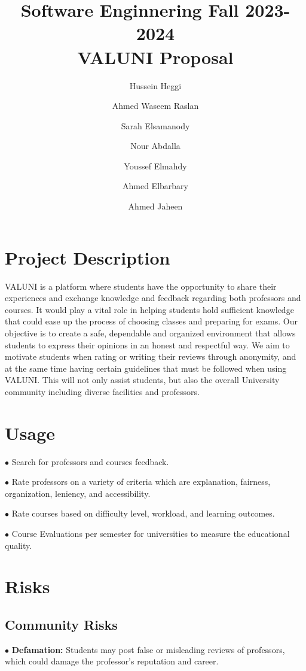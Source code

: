 \documentclass{article}
\title{Software Enginnering Fall 2023-2024 \\ VALUNI Proposal}
\author{  
Hussein Heggi 	\and
Ahmed Waseem Raslan 	\and
Sarah Elsamanody 	\and
Nour Abdalla 	\and
Youssef Elmahdy	\and
Ahmed Elbarbary	\and 
Ahmed Jaheen}
\begin{document}
\begin{titlingpage}
\maketitle
\end{titlingpage}

\break

\tableofcontents

\break

\section{Project Description}
\quad VALUNI is a platform where students have the opportunity to share their experiences and exchange knowledge and feedback regarding both professors and courses.  It would play a vital role in helping students hold sufficient knowledge that could ease up the process of choosing classes and preparing for exams. Our objective is to create a safe, dependable and organized environment that allows students to express their opinions in an honest and respectful way. We aim to motivate students when rating or writing their reviews through anonymity, and at the same time having certain guidelines that must be followed when using VALUNI. This will not only assist students, but also the overall University community including diverse facilities and professors. 

\section{Usage}
$\bullet$ Search for professors and courses feedback.  

$\bullet$ Rate professors on a variety of criteria which are explanation, fairness, organization, leniency, and accessibility.

$\bullet$ Rate courses based on difficulty level, workload, and learning outcomes.

$\bullet$ Course Evaluations per semester for universities to measure the educational quality.

\section{Risks} 

\subsection{Community Risks}
$\bullet$ \textbf{Defamation:} Students may post false or misleading reviews of professors, which could damage the professor's reputation and career.
\end{document}
